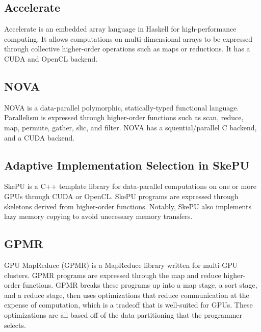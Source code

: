 \subsection*{Accelerate}
Accelerate\cite{accelerate} is an embedded array language in Haskell for 
high-performance
computing. It allows computations on multi-dimensional arrays to be expressed
through collective higher-order operations such as maps or reductions. It has
a CUDA and OpenCL backend.

\subsection*{NOVA}
NOVA\cite{collins2013nova} is a data-parallel polymorphic, statically-typed
functional language. Parallelism is expressed through higher-order functions
such as scan, reduce, map, permute, gather, slic, and filter. NOVA has a
squential/parallel C backend, and a CUDA backend.

\subsection*{Adaptive Implementation Selection in SkePU}
SkePU\cite{enmyren2010skepu} is a C++ template library for data-parallel
computations on one or more GPUs through CUDA or OpenCL. SkePU programs are
expressed through skeletons derived from higher-order functions. Notably,
SkePU also implements lazy memory copying to avoid unecessary memory transfers.

\subsection*{GPMR}
GPU MapReduce (GPMR)\cite{stuart2011multi} is a  MapReduce library written
for multi-GPU clusters. GPMR programs are expressed through the map and reduce
higher-order functions. GPMR breaks these programs up into a map stage, a sort stage, and a reduce stage, then uses optimizations that reduce communication at
the expense of computation, which is a tradeoff that is well-suited for GPUs.
These optimizations are all based off of the data partitioning that the
programmer selects.
